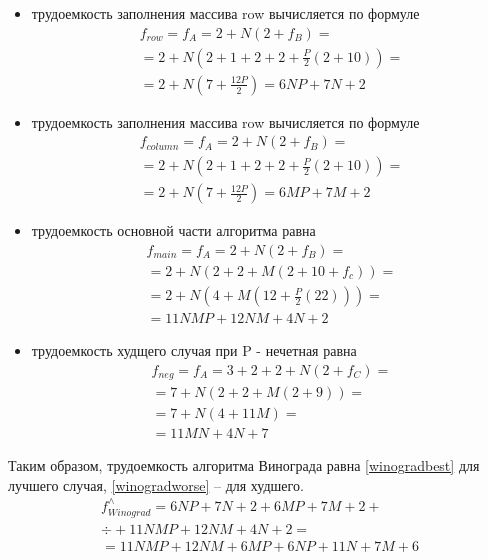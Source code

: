\begin{itemize}[left=\parindent]
    \item трудоемкость заполнения массива row вычисляется по формуле
        \begin{multline}\label{mulHeq}
            f_{row} = f_A = 2 + N(2 + f_B) = \\ = 2 + N(2 +
                       1 + 2 + 2 + \frac{P}{2}(2 + 10)) = \\ = 2 +
                       N(7 + \frac{12P}{2}) = 6NP + 7N + 2
        \end{multline}

        \item трудоемкость заполнения массива row вычисляется по формуле
        \begin{multline}\label{mulHeq}
            f_{column} = f_A = 2 + N(2 + f_B) = \\ = 2 + N(2 +
                       1 + 2 + 2 + \frac{P}{2}(2 + 10)) = \\ = 2 +
                       N(7 + \frac{12P}{2}) = 6MP + 7M + 2
        \end{multline}
    
    \item трудоемкость основной части алгоритма равна
        \begin{multline}\label{winmainbesteq}
            f_{main} = f_A = 2 + N(2 + f_B) = \\ =  2 + N(2 + 2 + M(2
            + 10 + f_c)) = \\ = 2 + N(4 + M(12 + \frac{P}{2}(22))) =
            \\ = 11NMP + 12NM + 4N + 2
        \end{multline}

    \item трудоемкость худщего случая при P - нечетная равна
        \begin{multline}\label{winmainworseeq}
            f_{neg} = f_A = 3 + 2 + 2 + N(2 + f_C) = \\ =  7 + N(2 + 2 + M(2 +
            9)) = \\ = 7 + N(4 + 11M) = \\ = 11MN + 4N + 7
        \end{multline}
\end{itemize}

Таким образом, трудоемкость алгоритма Винограда равна \ref{winogradbest} для
лучшего случая, \ref{winogradworse} -- для худшего.
\begin{multline}\label{winogradbest}
    f_{Winograd}^{\wedge} = 6NP + 7N + 2 + 6MP + 7M + 2 + \\
                            ÷+ 11NMP + 12NM + 4N + 2 = \\
                            = 11NMP + 12NM + 6MP + 6NP + 11N + 7M + 6
\end{multline}

